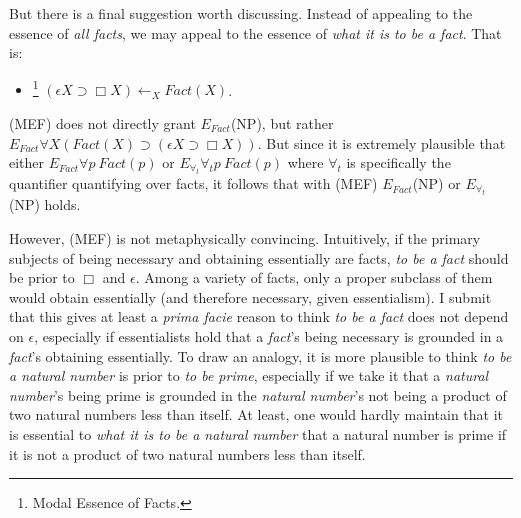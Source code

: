 \documentclass[12pt]{article}
\begin{document}
\par
But there is a final suggestion worth discussing. Instead of appealing to the essence of \textit{all facts}, we may appeal to the essence of \textit{what it is to be a fact}. That is:
\begin{itemize}
    \item[(MEF)]\footnote{Modal Essence of Facts.} $(\epsilon X \supset \Box X) \bm{\leftarrow}_X \textit{Fact}(X)$.
\end{itemize}
(MEF) does not directly grant $E_{\textit{Fact}}$(NP), but rather $E_{\textit{Fact}} \forall X (\textit{Fact}(X) \supset (\epsilon X \supset \Box X))$. But since it is extremely plausible that either $E_{\textit{Fact}}\forall p \ \textit{Fact}(p)$ or $E_{\forall_t} \forall_t p \ \textit{Fact}(p)$ where $\forall_t$ is specifically the quantifier quantifying over facts, it follows that with (MEF) $E_{\textit{Fact}}$(NP) or $E_{\forall_t}$(NP) holds. 
\par
However, (MEF) is not metaphysically convincing. Intuitively, if the primary subjects of being necessary and obtaining essentially are facts, \textit{to be a fact} should be prior to $\Box$ and $\epsilon$. Among a variety of facts, only a proper subclass of them would obtain essentially (and therefore necessary, given essentialism). I submit that this gives at least a \textit{prima facie} reason to think \textit{to be a fact} does not depend on $\epsilon$, especially if essentialists hold that a \textit{fact}'s being necessary is grounded in a \textit{fact}'s obtaining essentially. To draw an analogy, it is more plausible to think \textit{to be a natural number} is prior to \textit{to be prime}, especially if we take it that a \textit{natural number}'s being prime is grounded in the \textit{natural number}'s not being a product of two natural numbers less than itself. At least, one would hardly maintain that it is essential to \textit{what it is to be a natural number} that a natural number is prime if it is not a product of two natural numbers less than itself. 

\end{document}
